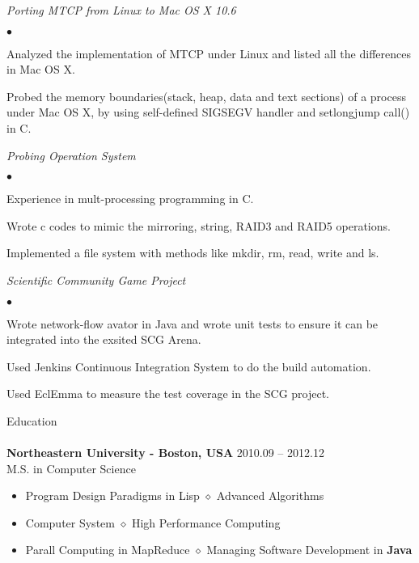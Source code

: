 \documentclass[10pt]{article}
\newcommand{\lineunder}{\vspace*{-8pt}\\\hspace*{-18pt}\hrulefill\\}
\newcommand{\header}[1]{{\hspace*{-15pt}\vspace*{6pt}\large{{#1}}}\vspace*{-6pt}\lineunder}
\newcommand{\project}[1]{\checkmark\normalsize{{\emph{#1}}}\\}
\newenvironment{achievements}
    {\begin{list}
        {$\bullet$}{\topsep 0pt \itemsep -1pt}} 
    {\end{list}}
\newcommand{\college}[5]{
    \textbf{#1 #2} \hfill #3 \\ #4 \\ #5
}
\begin{document}
  
  \project{Porting MTCP from Linux to Mac OS X 10.6}
  \begin{achievements}
\item Analyzed the implementation of MTCP under Linux and listed all the differences in Mac OS X.
\item Probed the memory boundaries(stack, heap, data and text sections) of a process under Mac OS X, by using self-defined SIGSEGV handler and setlongjump call() in C.
  \end{achievements}

\project{Probing Operation System}
  \begin{achievements}
\item Experience in mult-processing programming in C.
\item Wrote c codes to mimic the mirroring, string, RAID3 and RAID5 operations.
\item Implemented a file system with methods like mkdir, rm, read, write and ls.
  \end{achievements}

\project{Scientific Community Game Project}
  \begin{achievements}
\item Wrote network-flow avator in Java and wrote unit tests to ensure it can be integrated into the exsited SCG Arena.
\item Used Jenkins Continuous Integration System to do the build automation.
\item Used EclEmma to measure the test coverage in the SCG project.
  \end{achievements}


\vspace*{10pt}


\header{Education}

\college{Northeastern University}{- Boston, USA} {2010.09 -- 2012.12}
{M.S. in Computer Science}
{
\begin{itemize}
  \setlength{\itemsep}{0pt}
  \setlength{\parsep}{0pt}
  \setlength{\parskip}{0pt}
  \item {Program Design Paradigms in Lisp $\diamond$ Advanced Algorithms}
  \item {Computer System $\diamond$ High Performance Computing}
  \item {Parall Computing in MapReduce $\diamond$ Managing Software Development in \textbf{Java}}
\end{itemize}
}
\end{document}
